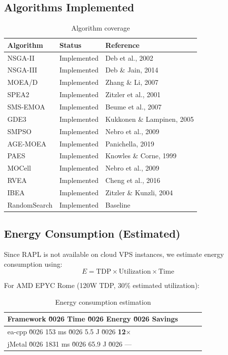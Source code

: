\documentclass[10pt,a4paper]{article}
\begin{document}
\subsection{Algorithms Implemented}

\begin{table}[h]
\centering
\caption{Algorithm coverage}
\label{tab:algorithms}
\begin{tabular}{@{}lll@{}}
\toprule
\textbf{Algorithm} & \textbf{Status} & \textbf{Reference} \\
\midrule
NSGA-II & Implemented & Deb et al., 2002 \\
NSGA-III & Implemented & Deb \& Jain, 2014 \\
MOEA/D & Implemented & Zhang \& Li, 2007 \\
SPEA2 & Implemented & Zitzler et al., 2001 \\
SMS-EMOA & Implemented & Beume et al., 2007 \\
GDE3 & Implemented & Kukkonen \& Lampinen, 2005 \\
SMPSO & Implemented & Nebro et al., 2009 \\
AGE-MOEA & Implemented & Panichella, 2019 \\
PAES & Implemented & Knowles \& Corne, 1999 \\
MOCell & Implemented & Nebro et al., 2009 \\
RVEA & Implemented & Cheng et al., 2016 \\
IBEA & Implemented & Zitzler \& Kunzli, 2004 \\
RandomSearch & Implemented & Baseline \\
\bottomrule
\end{tabular}
\end{table}

\subsection{Energy Consumption (Estimated)}

Since RAPL is not available on cloud VPS instances, we estimate energy consumption using:
\begin{equation}
    E = \text{TDP} \times \text{Utilization} \times \text{Time}
\end{equation}

For AMD EPYC Rome (120W TDP, 30\% estimated utilization):

\begin{table}[h]
\centering
\caption{Energy consumption estimation}
\label{tab:energy}
\begin{tabular}{@{}lrrr@{}}
\toprule
\textbf{Framework} \u0026 \textbf{Time} \u0026 \textbf{Energy} \u0026 \textbf{Savings} \\
\midrule
ea-cpp \u0026 153 ms \u0026 5.5 J \u0026 \textbf{12$\times$} \\
jMetal \u0026 1831 ms \u0026 65.9 J \u0026 --- \\
\bottomrule
\end{tabular}
\end{table}
\end{document}
